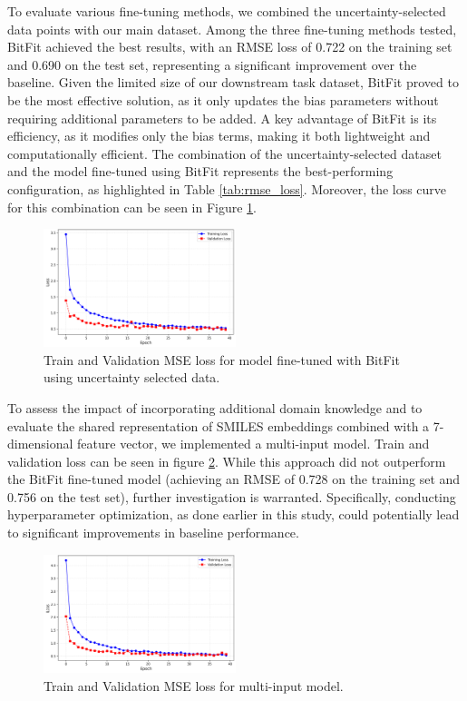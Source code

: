 \documentclass[11pt]{article}
\begin{document}
To evaluate various fine-tuning methods, we combined the uncertainty-selected data points with our main dataset. Among the three fine-tuning methods tested, BitFit achieved the best results, with an RMSE loss of 0.722 on the training set and 0.690 on the test set, representing a significant improvement over the baseline. Given the limited size of our downstream task dataset, BitFit proved to be the most effective solution, as it only updates the bias parameters without requiring additional parameters to be added. A key advantage of BitFit is its efficiency, as it modifies only the bias terms, making it both lightweight and computationally efficient. The combination of the uncertainty-selected dataset and the model fine-tuned using BitFit represents the best-performing configuration, as highlighted in Table \ref{tab:rmse_loss}. Moreover, the loss curve for this combination can be seen in Figure \ref{fig:BitFit-Uncertainty}.

\begin{figure}[htbp]
    \centering
    \includegraphics[width=0.5\textwidth]{BitFit_Uncertainty.png} 
    \caption{Train and Validation MSE loss for model fine-tuned with BitFit using uncertainty selected data.} %
    \label{fig:BitFit-Uncertainty} 
\end{figure}

To assess the impact of incorporating additional domain knowledge and to evaluate the shared representation of SMILES embeddings combined with a 7-dimensional feature vector, we implemented a multi-input model. Train and validation loss can be seen in figure \ref{fig:Multi-Input}. While this approach did not outperform the BitFit fine-tuned model (achieving an RMSE of 0.728 on the training set and 0.756 on the test set), further investigation is warranted. Specifically, conducting hyperparameter optimization, as done earlier in this study, could potentially lead to significant improvements in baseline performance.

\begin{figure}[htbp]
    \centering
    \includegraphics[width=0.5\textwidth]{Multi-Input.png} 
    \caption{Train and Validation MSE loss for multi-input model.}
    \label{fig:Multi-Input} 
\end{figure}
\end{document}
